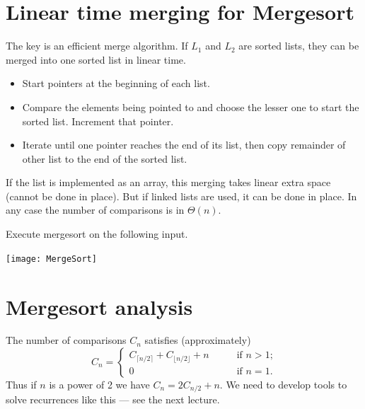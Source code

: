 \section{Linear time merging for Mergesort}
The key is an efficient merge algorithm. 
If $L_1$ and $L_2$ are sorted lists, they can be merged into one sorted 
list in linear time.
\begin{itemize}
  \item Start pointers at the beginning of each list. 
  \item Compare the elements being pointed to 
  and choose the lesser one to start the sorted list. Increment that pointer. 
  \item Iterate until one pointer reaches the end of its list, 
  then copy remainder of other list to the end of the sorted list.
\end{itemize} 
If the list is implemented as an array, this merging takes linear extra 
space (cannot be done in place). But if linked lists are used, it can be done in 
place. In any case the number of comparisons is in $\Theta(n)$.


\begin{Boxample}[0]
Execute mergesort on the following input.
\begin{center}
\texttt{[image: MergeSort]} 
\end{center}
\end{Boxample}

\section{Mergesort analysis}
The number of comparisons $C_n$ satisfies (approximately)
$$ C_n  = \left\{
\begin{array}{ll}
	C_{\lceil n/2 \rceil} + C_{\lfloor n/2 \rfloor} + n & \qquad \text{if }n > 1\text{;} \\
														0 & \qquad \text{if }n = 1\text{.}
\end{array}\right.$$
Thus if $n$ is a power of 2 we have $C_n = 2C_{n/2} + n$. We need to develop tools to solve recurrences like this --- see the next lecture.

